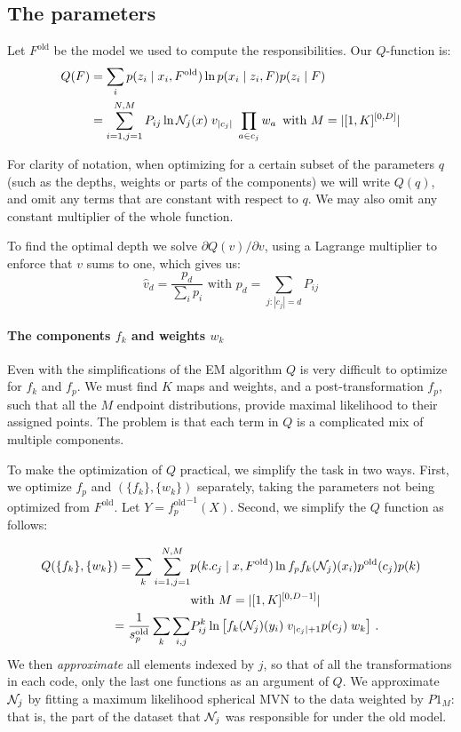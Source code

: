 \documentclass[10pt,a4paper,oneside]{article}
\theoremstyle{definition}
\newcommand{\p}{\mbox{\,.}}
\newcommand{\cN}{{\cal N}}
\theoremstyle{definition}
\begin{document}
\subsection{The parameters}

Let $F^\text{old}$ be the model we used to compute the responsibilities. Our $Q$-function is:
\begin{align*}
Q(F) &= \sum_{i} p(z_i \mid x_i, F^\text{old}) \ln p(x_i \mid z_i, F) p (z_i \mid F) \\
     &= \sum_{i=1,j=1}^{N, M} P_{ij} \ln \cN_j(x) \;v_{|c_j|}\; \prod_{a\in c_j}w_a \,\,\, \text{with } M = |[1,K]^{[0,D]}|
\end{align*}

For clarity of notation, when optimizing for a certain subset of the parameters $q$ (such as the depths, weights or parts of the components) we will write $Q(q)$, and omit any terms that are constant with respect to $q$. We may also omit any constant multiplier of the whole function.

To find the optimal depth we solve $\partial Q(v)/\partial v$, using a Lagrange multiplier to enforce that $v$ sums to one, which gives us:
\[
\hat v_d = \frac{p_d}{\sum_i p_i} \,\,\text{with } p_d = \sum_{j: |c_j| = d} P_{ij}
\]

\paragraph{The components $f_k$ and weights $w_k$}

Even with the simplifications of the EM algorithm $Q$ is very difficult to optimize for $f_k$ and $f_p$. We must find $K$ maps and weights, and a post-transformation $f_p$, such that all the $M$ endpoint distributions, provide maximal likelihood to their assigned points. The problem is that each term in $Q$ is a complicated mix of multiple components.

To make the optimization of $Q$ practical, we simplify the task in two ways. First, we optimize $f_p$ and $(\{f_k\}, \{w_k\})$ separately, taking the parameters not being optimized from $F^\text{old}$. Let $Y = {f_p^\text{old}}^{-1}(X)$. Second, we simplify the $Q$ function as follows: 

\begin{align*}
Q(\{f_k\}, \{w_k\}) = \sum_k \sum_{i=1,j=1}^{N, M} & p(k.c_j \mid x, F^\text{old}) \ln f_p f_k(\cN_{j})(x_i) p^{\text{old}}(c_j) p(k)\\ & \hfill \text{with } M = |[1,K]^{[0, D-1]}|  \\
= \frac{1}{s^\text{old}_p}\sum_k \sum_{i, j} &P^k_{ij} \ln \left[ f_k(\cN_{j})(y_i) \; v_{|c_j|+1} p(c_j) \; w_k \right]\p
\end{align*}
We then \emph{approximate} all elements indexed by $j$, so that of all the transformations in each code, only the last one functions as an argument of $Q$. We approximate $\cN_j$ by fitting a maximum likelihood spherical MVN to the data weighted by $P1_M$: that is, the part of the dataset that $\cN_j$ was responsible for under the old model. 
\end{document}
